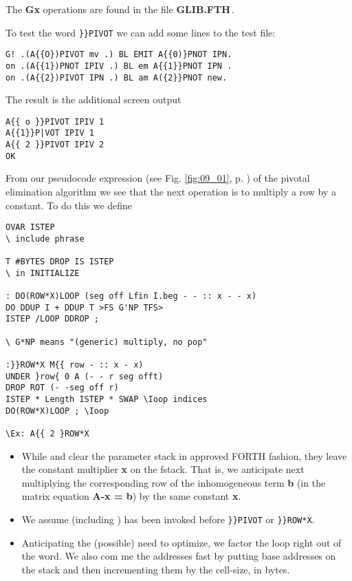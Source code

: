 The \textbf{Gx} operations are found in the file \textbf{GLIB.FTH}\,.

To test the word \verb|}}PIVOT| we can add some lines to the test file:

\begin{verbatim}
G! .(A{{O})PIVOT mv .) BL EMIT A{{0)}PNOT IPN.
on .(A{{1})PNOT IPIV .) BL em A{{1}}PNOT IPN .
on .(A{{2})PIVOT IPN .) BL am A({2}}PNOT new.
\end{verbatim}
The result is the additional screen output


\begin{verbatim}
A{{ o }}PIVOT IPIV 1
A{{1}}P|VOT IPIV 1
A{{ 2 }}PIVOT IPIV 2
OK
\end{verbatim}

From our pseudocode expression (see Fig. \ref{fig:09_01}, p. \pageref{fig:09_01}) of the
pivotal elimination algorithm we see that the next operation is to
multiply a row by a constant. To do this we define

\begin{verbatim}
OVAR ISTEP
\ include phrase

T #BYTES DROP IS ISTEP
\ in INITIALIZE

: DO(ROW*X)LOOP (seg off Lfin I.beg - - :: x - - x)
DO DDUP I + DDUP T >FS G'NP TFS>
ISTEP /LOOP DDROP ;

\ G*NP means "(generic) multiply, no pop"

:}}ROW*X M{{ row - :: x - x)
UNDER }row{ 0 A (- - r seg offt)
DROP ROT (- -seg off r)
ISTEP * Length ISTEP * SWAP \Ioop indices
DO(ROW*X)LOOP ; \Ioop

\Ex: A{{ 2 }ROW*X

\end{verbatim}

\begin{itemize}
    \item  While  and  clear the parameter stack in approved FORTH fashion, they leave the constant
        multiplier \textbf{x} on the fstack. That is, we anticipate next multiplying the corresponding row of the inhomogeneous term \textbf{b} (in
        the matrix equation \textbf{A-x = b}) by the same constant \textbf{x}.
    \item We assume  (including ) has been
        invoked before \verb|}}PIVOT| or \verb|}}ROW*X|.
  \item Anticipating the (possible) need to optimize, we factor the loop
right out of the word. We also com me the addresses fast by
putting base addresses on the stack and then incrementing
them by the cell-size, in bytes.
\end{itemize}

